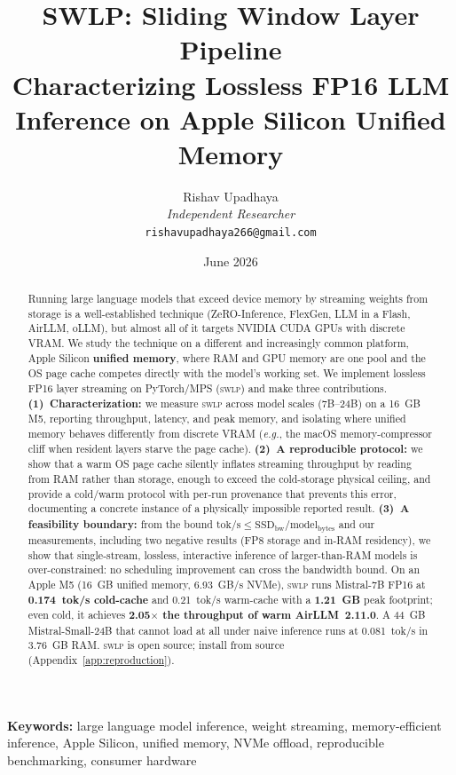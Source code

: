 \documentclass[10pt,a4paper]{article}
\title{
  \textbf{SWLP: Sliding Window Layer Pipeline}\\[0.3em]
  \large Characterizing Lossless FP16 LLM Inference on Apple Silicon Unified Memory
}
\author{
  Rishav Upadhaya\\
  \textit{Independent Researcher}\\
  \texttt{rishavupadhaya266@gmail.com}
}
\date{June 2026}
\newcommand{\swlp}{\textsc{swlp}}
\newcommand{\eg}{\textit{e.g.}}
\begin{document}
\maketitle
\thispagestyle{fancy}

\begin{abstract}
Running large language models that exceed device memory by streaming weights from
storage is a well-established technique (ZeRO-Inference, FlexGen, LLM in a Flash,
AirLLM, oLLM), but almost all of it targets NVIDIA CUDA GPUs with discrete VRAM.
We study the technique on a different and increasingly common platform, Apple
Silicon \textbf{unified memory}, where RAM and GPU memory are one pool and the
OS page cache competes directly with the model's working set. We implement
lossless FP16 layer streaming on PyTorch/MPS (\swlp) and make three contributions.
\textbf{(1)~Characterization:} we measure \swlp{} across model scales (7B--24B) on a
16~GB M5, reporting throughput, latency, and peak memory, and isolating where
unified memory behaves differently from discrete VRAM (\eg, the macOS
memory-compressor cliff when resident layers starve the page cache).
\textbf{(2)~A reproducible protocol:} we show that a warm OS page cache silently
inflates streaming throughput by reading from RAM rather than storage, enough
to exceed the cold-storage physical ceiling, and provide a cold/warm protocol
with per-run provenance that prevents this error, documenting a concrete instance
of a physically impossible reported result. \textbf{(3)~A feasibility boundary:}
from the bound $\text{tok/s} \le \text{SSD}_{\text{bw}} / \text{model}_{\text{bytes}}$
and our measurements, including two negative results (FP8 storage and in-RAM
residency), we show that single-stream, lossless, interactive inference of
larger-than-RAM models is over-constrained: no scheduling improvement can cross
the bandwidth bound. On an Apple M5 (16~GB unified memory, 6.93~GB/s NVMe), \swlp{}
runs Mistral-7B FP16 at \textbf{0.174~tok/s cold-cache} and 0.21~tok/s warm-cache
with a \textbf{1.21~GB} peak footprint; even cold, it achieves
\textbf{2.05$\times$ the throughput of warm AirLLM~2.11.0}. A 44~GB Mistral-Small-24B
that cannot load at all under naive inference runs at 0.081~tok/s in 3.76~GB RAM.
\swlp{} is open source; install from source (Appendix~\ref{app:reproduction}).
\end{abstract}

\textbf{Keywords:} large language model inference, weight streaming,
memory-efficient inference, Apple Silicon, unified memory, NVMe offload,
reproducible benchmarking, consumer hardware
\end{document}

